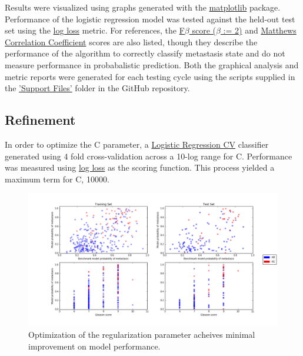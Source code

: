 \documentclass[final]{article}
\begin{document}
Results were visualized using graphs generated with the
\href{http://matplotlib.org/index.html}{matplotlib} package.  Performance of the
logistic regression model was tested against the held-out test set using the
\href{http://scikit-learn.org/stable/modules/generated/sklearn.metrics.log_loss.html#sklearn.metrics.log_loss}{log
loss} metric.  For references, the
\href{http://scikit-learn.org/stable/modules/generated/sklearn.metrics.fbeta_score.html}{F$\beta$
score ($\beta$ := 2)} and
\href{http://scikit-learn.org/stable/modules/generated/sklearn.metrics.matthews_corrcoef.html}{Matthews
Correlation Coefficient} scores are also listed, though they describe the
performance of the algorithm to correctly classify metastasis state and do not
measure performance in probabalistic prediction.  Both the graphical analysis
and metric reports were generated for each testing cycle using the scripts
supplied in the
\href{https://github.com/CCThompson82/MLE_capstone/tree/master/Support%20Files}{'Support
Files'} folder in the GitHub repository.

\subsection{Refinement}

In order to optimize the C parameter, a \href{http://scikit-learn.org/stable/modules/generated/sklearn.linear_model.LogisticRegressionCV.html#sklearn.linear_model.LogisticRegressionCV}{Logistic Regression CV}
classifier generated using 4 fold cross-validation across a 10-log range for C.
Performance was measured using \href{http://scikit-learn.org/stable/modules/generated/sklearn.metrics.log_loss.html#sklearn.metrics.log_loss}{log loss}
as the  scoring function.  This process yielded a maximum term for C, 10000.

\begin{figure}
  \centering
    \includegraphics[width=\textwidth]{optPC3}
    \caption{\label{fig:PC3}Optimization of the regularization parameter acheives minimal improvement on model performance.}
\end{figure}
\end{document}
